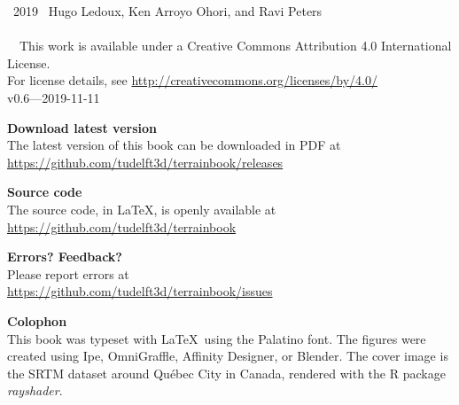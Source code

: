 
\clearpage
\thispagestyle{empty}
\null%
\vfill


\textcopyright\ 2019 \, Hugo Ledoux, Ken Arroyo Ohori, and Ravi Peters
\\ \\
\ccLogo\ \ccAttribution\ This work is available under a Creative Commons Attribution 4.0 International License.
\\For license details, see \url{http://creativecommons.org/licenses/by/4.0/}
\\


v0.6---2019-11-11


\textbf{Download latest version} \\
The latest version of this book can be downloaded in PDF at\\ 
\url{https://github.com/tudelft3d/terrainbook/releases}


\textbf{Source code} \\
The source code, in \LaTeX, is openly available at\\
\url{https://github.com/tudelft3d/terrainbook}


\textbf{Errors? Feedback?} \\
Please report errors at\\
\url{https://github.com/tudelft3d/terrainbook/issues}

\textbf{Colophon} \\
This book was typeset with \LaTeX\ using the Palatino font.
The figures were created using Ipe, OmniGraffle, Affinity Designer, or Blender.
The cover image is the SRTM dataset around Québec City in Canada, rendered with the R package \emph{rayshader}.
